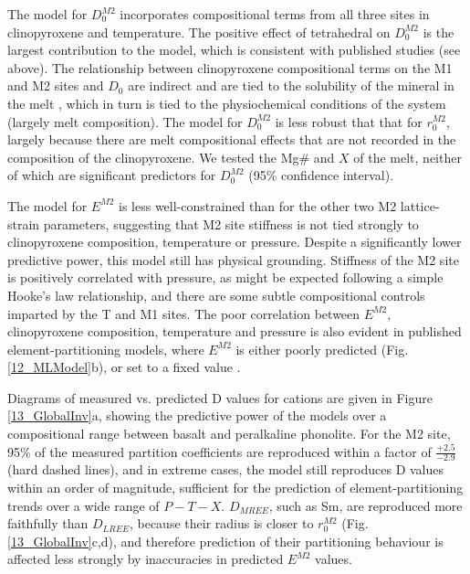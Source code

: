 \documentclass[review,authoryear,12pt]{elsarticle}
\begin{document}
The model for $D_0^{M2}$ incorporates compositional terms from all three sites in clinopyroxene and temperature. The positive effect of tetrahedral  on $D_0^{M2}$ is the largest contribution to the model, which is consistent with published studies (see above). The relationship between clinopyroxene compositional terms on the M1 and M2 sites and $D_0$ are indirect and are tied to the solubility of the mineral in the melt \citep{Wood2003}, which in turn is tied to the physiochemical conditions of the system (largely melt composition). The model for $D_0^{M2}$ is less robust that that for $r_0^{M2}$, largely because there are melt compositional effects that are not recorded in the composition of the clinopyroxene. We tested the Mg\# and $X$ of the melt, neither of which are significant predictors for $D_0^{M2}$ (95\% confidence interval).

The model for $E^{M2}$ is less well-constrained than for the other two M2 lattice-strain parameters, suggesting that M2 site stiffness is not tied strongly to clinopyroxene composition, temperature or pressure. Despite a significantly lower predictive power, this model still has physical grounding. Stiffness of the M2 site is positively correlated with pressure, as might be expected following a simple Hooke's law relationship, and there are some subtle compositional controls imparted by the T and M1 sites. The poor correlation between $E^{M2}$, clinopyroxene composition, temperature and pressure is also evident in published element-partitioning models, where $E^{M2}$ is either poorly predicted (Fig. \ref{12_MLModel}b), or set to a fixed value \citep[e.g.][]{Dygert2014}.

Diagrams of measured vs. predicted D values for  cations are given in Figure \ref{13_GlobalInv}a, showing the predictive power of the models over a compositional range between basalt and peralkaline phonolite. For the M2 site, 95\% of the measured  partition coefficients are reproduced within a factor of $\frac{+ 2.5}{- 2.9}$ (hard dashed lines), and in extreme cases, the model still reproduces D values within an order of magnitude, sufficient for the prediction of element-partitioning trends over a wide range of $P-T-X$. $D_{MREE}$, such as Sm, are reproduced more faithfully than $D_{LREE}$, because their radius is closer to $r_0^{M2}$ (Fig. \ref{13_GlobalInv}c,d), and therefore prediction of their partitioning behaviour is affected less strongly by inaccuracies in predicted $E^{M2}$ values.

\end{document}
